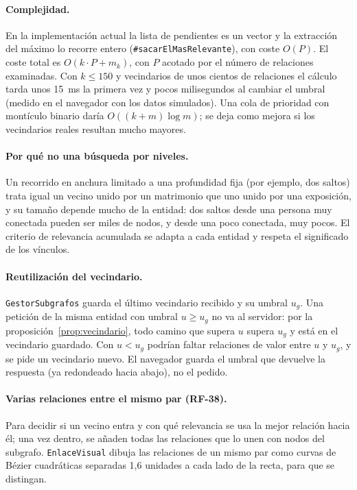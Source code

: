 \paragraph{Complejidad.} En la implementación actual la lista de pendientes es un vector y la extracción del máximo lo recorre entero (\texttt{\#sacarElMasRelevante}), con coste $O(P)$. El coste total es $O(k\cdot P + m_k)$, con $P$ acotado por el número de relaciones examinadas. Con $k\le150$ y vecindarios de unos cientos de relaciones el cálculo tarda unos 15~ms la primera vez y pocos milisegundos al cambiar el umbral (medido en el navegador con los datos simulados). Una cola de prioridad con montículo binario daría $O((k+m)\log m)$; se deja como mejora si los vecindarios reales resultan mucho mayores. %

\paragraph{Por qué no una búsqueda por niveles.} Un recorrido en anchura limitado a una profundidad fija (por ejemplo, dos saltos) trata igual un vecino unido por un matrimonio que uno unido por una exposición, y su tamaño depende mucho de la entidad: dos saltos desde una persona muy conectada pueden ser miles de nodos, y desde una poco conectada, muy pocos. El criterio de relevancia acumulada se adapta a cada entidad y respeta el significado de los vínculos.

\paragraph{Reutilización del vecindario.} \texttt{GestorSubgrafos} guarda el último vecindario recibido y su umbral $u_g$. Una petición de la misma entidad con umbral $u\ge u_g$ no va al servidor: por la proposición~\ref{prop:vecindario}, todo camino que supera $u$ supera $u_g$ y está en el vecindario guardado. Con $u<u_g$ podrían faltar relaciones de valor entre $u$ y $u_g$, y se pide un vecindario nuevo. El navegador guarda el umbral que devuelve la respuesta (ya redondeado hacia abajo), no el pedido.

\paragraph{Varias relaciones entre el mismo par (RF-38).} Para decidir si un vecino entra y con qué relevancia se usa la mejor relación hacia él; una vez dentro, se añaden todas las relaciones que lo unen con nodos del subgrafo. \texttt{EnlaceVisual} dibuja las relaciones de un mismo par como curvas de Bézier cuadráticas separadas 1,6 unidades a cada lado de la recta, para que se distingan.

